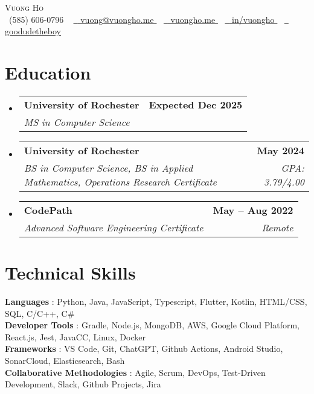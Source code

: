 \documentclass[letterpaper,11pt]{article}
\makeatletter
\newcommand{\resumeSubheading}[4]{
  \vspace{-2pt}\item
    \begin{tabular*}{1.0\textwidth}[t]{l@{\extracolsep{\fill}}r}
      \textbf{#1} & \textbf{\small #2} \\
      \textit{\small#3} & \textit{\small #4} \\
    \end{tabular*}\vspace{-7pt}
}
\newcommand{\resumeSubHeadingListStart}{\begin{itemize}[leftmargin=0.0in, label={}]}
\newcommand{\resumeSubHeadingListEnd}{\end{itemize}}
\makeatother
\begin{document}
\begin{center}
  {\Huge \scshape Vuong Ho} \\ \vspace{1pt}
  \small \raisebox{-0.1\height}
  \faPhone\ (585) 606-0796
  ~ \href{mailto:vuong@vuongho.me}{\raisebox{-0.2\height} \faEnvelope\ \underline{ vuong@vuongho.me }}
   ~ \href{ https://vuongho.me/ }{\raisebox{-0.2\height} \faHome\ \underline{ vuongho.me }} 
   ~ \href{ https://linkedin.com/in/vuongho/ }{\raisebox{-0.2\height} \faLinkedin\ \underline{ in/vuongho }} 
   ~ \href{https://github.com/{'link': 'https://github.com/goodudetheboy/', 'alias': 'goodudetheboy'}}{\raisebox{-0.2\height} \faGithub\ \underline{ goodudetheboy }} 
  \vspace{-8pt}
\end{center}


\section{Education}
  \resumeSubHeadingListStart
  
    \resumeSubheading
      { University of Rochester }{ Expected Dec 2025 }
      { MS in Computer Science } {  }
  
    \resumeSubheading
      { University of Rochester }{ May 2024 }
      { BS in Computer Science, BS in Applied Mathematics, Operations Research Certificate } { GPA: 3.79/4.00 }
  
    \resumeSubheading
      { CodePath }{ May – Aug 2022 }
      { Advanced Software Engineering Certificate } { Remote }
  
  \resumeSubHeadingListEnd

\section{Technical Skills}
 \begin{itemize}[leftmargin=0.15in, label={}]
    \small{\item{
      
        \textbf{ Languages }{: Python, Java, JavaScript, Typescript, Flutter, Kotlin, HTML/CSS, SQL, C/C++, C\#} \\
      
        \textbf{ Developer Tools }{: Gradle, Node.js, MongoDB, AWS, Google Cloud Platform, React.js, Jest, JavaCC, Linux, Docker} \\
      
        \textbf{ Frameworks }{: VS Code, Git, ChatGPT, Github Actions, Android Studio, SonarCloud, Elasticsearch, Bash} \\
      
        \textbf{ Collaborative Methodologies }{: Agile, Scrum, DevOps, Test-Driven Development, Slack, Github Projects, Jira} \\
      
    }}
 \end{itemize} 
 \vspace{-16pt}
\end{document}
